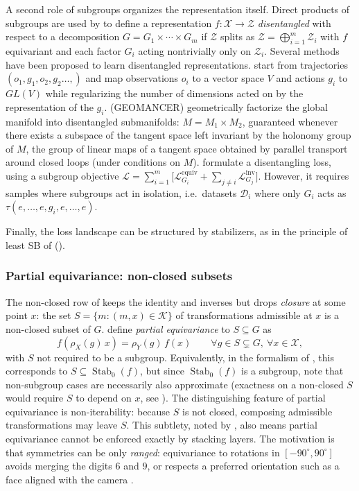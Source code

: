 \documentclass[mathematics,review,submit,moreauthors]{Definitions/mdpi}
\begin{document}
A second role of subgroups organizes the representation itself.
Direct products of subgroups are used by \citet{higgins2018} to define a representation $f\colon \mathcal{X}\to \mathcal{Z}$ \emph{disentangled} with respect to a decomposition $G=G_1\times\cdots\times G_m$ if $\mathcal{Z}$ splits as $\mathcal{Z}=\bigoplus_{i=1}^m \mathcal{Z}_i$ with $f$ equivariant and each factor $G_i$ acting nontrivially only on $\mathcal{Z}_i$.
Several methods have been proposed to learn disentangled representations.
\citet{quessard2020anips} start from trajectories $(o_1, g_1, o_2, g_2 \dots, )$ and map observations $o_i$ to a vector space $V$ and actions $g_i$ to $GL(V)$ while regularizing the number of dimensions acted on by the representation of the $g_i$.
\citet{pfau2020anips} (GEOMANCER) geometrically factorize the global manifold into disentangled submanifolds: $M=M_1\times M_2$, guaranteed whenever there exists a subspace of the tangent space left invariant by the holonomy group of $M$, the group of linear maps of a tangent space obtained by parallel transport around closed loops (under conditions on $M$).
\citet{shakerinava2022anips} formulate a disentangling loss, using a subgroup objective $\mathcal{L}=\sum_{i=1}^{m} \big[\mathcal{L}_{G_i}^{\mathrm{equiv}} + \sum_{j\neq i} \mathcal{L}_{G_j}^{\mathrm{inv}}\big]$.
However, it requires samples where subgroups act in isolation, i.e.\ datasets $\mathcal{D}_i$ where only $G_i$ acts as $\tau (e, \dots, e, g_i, e, \dots, e)$.

Finally, the loss landscape can be structured by stabilizers, as in the principle of least SB of \citet{arjevani2023} ().

\subsubsection{Partial equivariance: non-closed subsets}\label{sec:non-closed-subsets}
The non-closed row of  keeps the identity and inverses but drops \emph{closure} at some point $x$: the set $S=\{m:(m,x)\in\mathcal K\}$ of transformations admissible at $x$ is a non-closed subset of $G$.
\citet{romero2023} define \emph{partial equivariance} to $S\subseteq G$ as
$$f(\rho_X(g)\,x)=\rho_Y(g)\,f(x)\qquad \forall g\in S\subsetneq G,\ \forall x\in \mathcal{X},$$
with $S$ not required to be a subgroup.
Equivalently, in the formalism of \citet{petrache2023}, this corresponds to $S\subseteq\operatorname{Stab}_0(f)$, but since $\operatorname{Stab}_0(f)$ is a subgroup, \citet{romero2023} note that non-subgroup cases are necessarily also approximate (exactness on a non-closed $S$ would require $S$ to depend on $x$, see ).
The distinguishing feature of partial equivariance is non-iterability: because $S$ is not closed, composing admissible transformations may leave $S$.
This subtlety, noted by \citet{romero2023}, also means partial equivariance cannot be enforced exactly by stacking layers.
The motivation is that symmetries can be only \emph{ranged}: equivariance to rotations in $[-90^\circ,90^\circ]$ avoids merging the digits $6$ and $9$, or respects a preferred orientation such as a face aligned with the camera \citep{romero2023}.
\end{document}
